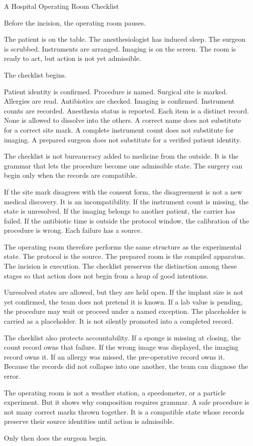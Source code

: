 \begin{coda}{A Hospital Operating Room Checklist}

Before the incision, the operating room pauses.

The patient is on the table. The anesthesiologist has induced sleep. The surgeon
is scrubbed. Instruments are arranged. Imaging is on the screen. The room is
ready to act, but action is not yet admissible.

The checklist begins.

Patient identity is confirmed. Procedure is named. Surgical site is marked.
Allergies are read. Antibiotics are checked. Imaging is confirmed. Instrument
counts are recorded. Anesthesia status is reported. Each item is a distinct
record. None is allowed to dissolve into the others. A correct name does not
substitute for a correct site mark. A complete instrument count does not
substitute for imaging. A prepared surgeon does not substitute for a verified
patient identity.

The checklist is not bureaucracy added to medicine from the outside. It is the
grammar that lets the procedure become one admissible state. The surgery can
begin only when the records are compatible.

If the site mark disagrees with the consent form, the disagreement is not a new
medical discovery. It is an incompatibility. If the instrument count is missing,
the state is unresolved. If the imaging belongs to another patient, the carrier
has failed. If the antibiotic time is outside the protocol window, the
calibration of the procedure is wrong. Each failure has a source.

The operating room therefore performs the same structure as the experimental
state. The protocol is the source. The prepared room is the compiled apparatus.
The incision is execution. The checklist preserves the distinction among these
stages so that action does not begin from a heap of good intentions.

Unresolved states are allowed, but they are held open. If the implant size is
not yet confirmed, the team does not pretend it is known. If a lab value is
pending, the procedure may wait or proceed under a named exception. The
placeholder is carried as a placeholder. It is not silently promoted into a
completed record.

The checklist also protects accountability. If a sponge is missing at closing,
the count record owns that failure. If the wrong image was displayed, the
imaging record owns it. If an allergy was missed, the pre-operative record owns
it. Because the records did not collapse into one another, the team can
diagnose the error.

The operating room is not a weather station, a speedometer, or a particle
experiment. But it shows why composition requires grammar. A safe procedure is
not many correct marks thrown together. It is a compatible state whose records
preserve their source identities until action is admissible.

Only then does the surgeon begin.

\end{coda}

